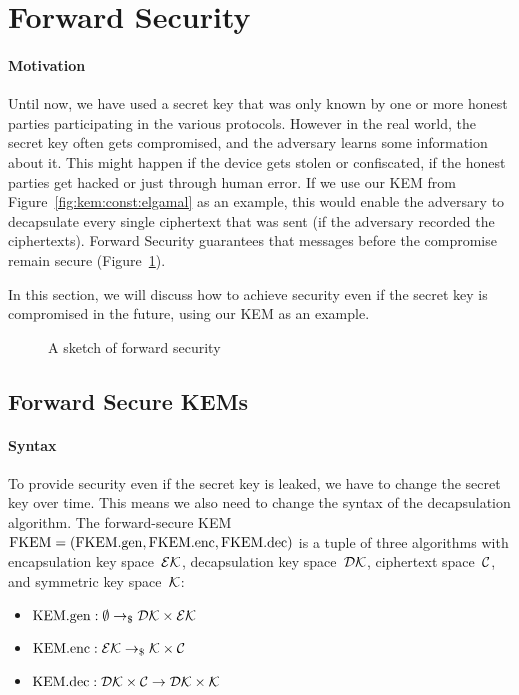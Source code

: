 \section{Forward Security}
\label{sec:forward-sec}

\paragraph{Motivation} Until now, we have used a secret key that was only known by one or more honest parties participating in the various protocols.
However in the real world, the secret key often gets compromised, and the adversary learns some information about it.
This might happen if the device gets stolen or confiscated, if the honest parties get hacked or just through human error.
If we use our KEM from Figure~\ref{fig:kem:const:elgamal} as an example, this would enable the adversary to decapsulate every single ciphertext that was sent (if the adversary recorded the ciphertexts).
Forward Security guarantees that messages before the compromise remain secure (Figure~\ref{fig:fs:sketch}).

In this section, we will discuss how to achieve security even if the secret key is compromised in the future, using our KEM as an example.

\begin{figure}[!ht]
    \centering
    
    \caption{A sketch of forward security}
    \label{fig:fs:sketch}
\end{figure}

\subsection{Forward Secure KEMs}

\paragraph{Syntax} To provide security even if the secret key is leaked, we have to change the secret key over time.
This means we also need to change the syntax of the decapsulation algorithm.
The forward-secure KEM $\mathrm{FKEM}=(\mathrm{FKEM}.\mathrm{gen},\mathrm{FKEM}.\mathrm{enc},\mathrm{FKEM}.\mathrm{dec})$ is a tuple of three algorithms with encapsulation key space~$\mathcal{EK}$, decapsulation key space~$\mathcal{DK}$, ciphertext space~$\mathcal{C}$, and symmetric key space~$\mathcal{K}$:
\begin{itemize}
    \item $\mathrm{KEM}.\mathrm{gen}: \emptyset \to_\$ \mathcal{DK}\times\mathcal{EK}$
    \item $\mathrm{KEM}.\mathrm{enc}: \mathcal{EK} \to_\$ \mathcal{K}\times\mathcal{C}$
    \item $\mathrm{KEM}.\mathrm{dec}: \mathcal{DK}\times\mathcal{C} \to \mathcal{DK}\times\mathcal{K}$
\end{itemize}

